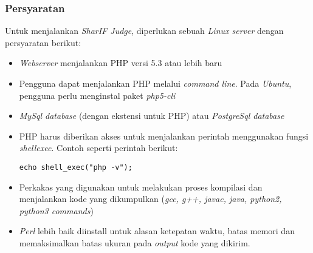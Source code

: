 \subsubsection{Persyaratan}
\label{subsubsec:persyaratan}
Untuk menjalankan \textit{SharIF Judge}, diperlukan sebuah \textit{Linux server} dengan persyaratan berikut:
\begin{itemize}
	\item \textit{Webserver} menjalankan PHP versi 5.3 atau lebih baru
	\item Pengguna dapat menjalankan PHP melalui \textit{command line}. Pada \textit{Ubuntu}, pengguna perlu menginstal paket \textit{php5-cli}
	\item \textit{MySql database} (dengan ekstensi untuk PHP) atau \textit{PostgreSql database}
	\item PHP harus diberikan akses untuk menjalankan perintah menggunakan fungsi \textit{shell\textunderscore exec}. Contoh seperti perintah berikut:
	\begin{lstlisting}[basicstyle=\ttfamily, frame=single,
	columns=fullflexible, keepspaces=true, breaklines=true, label=ls:1]
	echo shell_exec("php -v");
	\end{lstlisting}
	\item Perkakas yang digunakan untuk melakukan proses kompilasi dan menjalankan kode yang dikumpulkan (\textit{gcc, g++, javac, java, python2, python3 commands})
	\item \textit{Perl} lebih baik diinstall untuk alasan ketepatan waktu, batas memori dan memaksimalkan batas ukuran pada \textit{output} kode yang dikirim.
\end{itemize}


